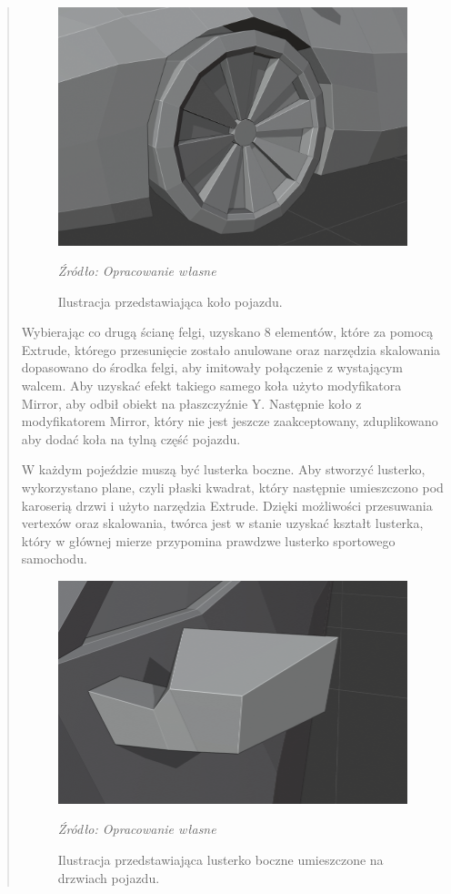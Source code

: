 \begin{quotation}
\begin{figure}[!hbt]
\centering
  \includegraphics[width=0.7\linewidth]{opona.png}
  \caption{Ilustracja przedstawiająca koło pojazdu.}\label{rys_11}
  \begin{minipage}[t]{0.75\linewidth}
    \emph{Źródło: Opracowanie własne}
  \end{minipage}
\end{figure}

Wybierając co drugą ścianę felgi, uzyskano 8 elementów, które za pomocą Extrude, którego przesunięcie zostało anulowane oraz narzędzia skalowania dopasowano do środka felgi, aby imitowały połączenie z wystającym walcem. Aby uzyskać efekt takiego samego koła użyto modyfikatora Mirror, aby odbił obiekt na płaszczyźnie Y. Następnie koło z modyfikatorem Mirror, który nie jest jeszcze zaakceptowany, zduplikowano aby dodać koła na tylną część pojazdu.

\indent W każdym pojeździe muszą być lusterka boczne. Aby stworzyć lusterko, wykorzystano plane, czyli płaski kwadrat, który następnie umieszczono pod karoserią drzwi i użyto narzędzia Extrude. Dzięki możliwości przesuwania vertexów oraz skalowania, twórca jest w stanie uzyskać kształt lusterka, który w głównej mierze przypomina prawdzwe lusterko sportowego samochodu.

\begin{figure}[!hbt]
\centering
  \includegraphics[width=0.8\linewidth]{lusterko.png}
  \caption{Ilustracja przedstawiająca lusterko boczne umieszczone na drzwiach pojazdu.}\label{rys_12}
  \begin{minipage}[t]{0.75\linewidth}
    \emph{Źródło: Opracowanie własne}
  \end{minipage}
\end{figure}


\end{quotation}
